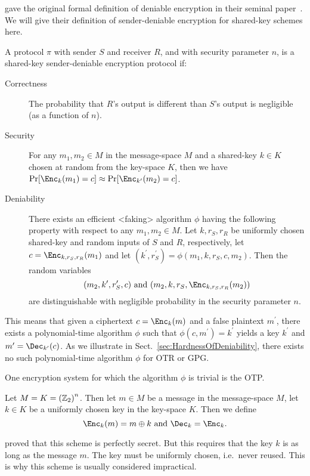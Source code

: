 \citeauthor{deniablecrypt} gave the original formal definition of deniable 
encryption in their seminal paper~\cite{deniablecrypt}.
We will give their definition of sender-deniable encryption for shared-key 
schemes here.
\begin{definition}\label{def:DeniableEnc}
  A protocol \(\pi\) with sender \(S\) and receiver \(R\), and with security 
  parameter \(n\), is a shared-key sender-deniable encryption protocol if:
  \begin{description}
    \item[Correctness] The probability that \(R\)'s output is different than 
      \(S\)'s output is negligible (as a function of \(n\)).

    \item[Security] For any \(m_1, m_2\in M\) in the message-space \(M\) and 
      a shared-key \(k\in K\) chosen at random from the key-space \(K\), then 
      we have \(\Pr[ \Enc_k( m_1 ) = c ] \approx \Pr[ \Enc_{k^\prime}( m_2 
      ) = c ]\).

    \item[Deniability] There exists an efficient <faking> algorithm \(\phi\) 
      having the following property with respect to any \(m_1, m_2\in M\).
      Let \(k, r_S, r_R\) be uniformly chosen shared-key and random inputs of 
      \(S\) and \(R\), respectively, let \(c = \Enc_{k, r_S, r_R}( m_1 )\) and 
      let \((k^\prime, r_S^\prime) = \phi( m_1, k, r_S, c, m_2 )\).
      Then the random variables \[
        ( m_2, k^\prime, r_S^\prime, c ) \text{ and }
        ( m_2, k, r_S, \Enc_{k, r_S, r_R}( m_2 ) )
      \] are distinguishable with negligible probability in the security 
      parameter \(n\).
  \end{description}
\end{definition}
This means that given a ciphertext \(c = \Enc_k( m )\) and a false plaintext 
\(m^\prime\), there exists a polynomial-time algorithm \(\phi\) such that 
\(\phi( c, m^\prime ) = k^\prime\) yields a key \(k^\prime\) and \(m^\prime 
= \Dec_{k^\prime}( c )\).
As we illustrate in Sect.~\ref{sec:HardnessOfDeniability}, there exists no such 
polynomial-time algorithm \(\phi\) for \ac{OTR} or \ac{GPG}.

One encryption system for which the algorithm \(\phi\) is trivial is the 
\ac{OTP}.
\begin{definition}\label{def:OTP}
  Let \(M = K = {(\mathbb{Z}_2)}^n\).
  Then let \(m\in M\) be a message in the message-space \(M\), let \(k\in K\) 
  be a uniformly chosen key in the key-space \(K\).
  Then we define \[
    \Enc_k( m ) = m\oplus k \text{ and } \Dec_k = \Enc_k.
  \]
\end{definition}
\citet{ShannonSecrecy} proved that this scheme is perfectly secret.
But this requires that the key \(k\) is as long as the message \(m\).
The key must be uniformly chosen, i.e.~never reused.
This is why this scheme is usually considered impractical.

